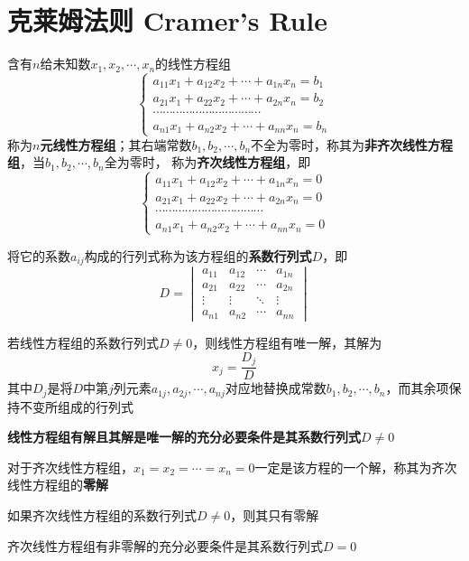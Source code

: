 \documentclass[UTF8]{ctexart}
\newcommand{\emplin}{\vspace{1em}}
\begin{document}
\section*{克莱姆法则 Cramer's Rule}
含有$n$给未知数$x_1,x_2,\cdots,x_n$的线性方程组
\[\left\{
\begin{aligned}
a_{11}x_1+a_{12}x_2+\cdots+a_{1n}x_n=b_1\\
a_{21}x_1+a_{22}x_2+\cdots+a_{2n}x_n=b_2\\
\cdots\cdots\cdots\cdots\cdots\cdots\cdots\cdots\cdots\cdots\cdots\\
a_{n1}x_1+a_{n2}x_2+\cdots+a_{nn}x_n=b_n
\end{aligned}
\right.\]
称为\textbf{$n$元线性方程组}；其右端常数$b_1,b_2,\cdots,b_n$不全为零时，称其为\textbf{非齐次线性方程组}，当$b_1,b_2,\cdots,b_n$全为零时，
称为\textbf{齐次线性方程组}，即
\[\left\{
\begin{aligned}
a_{11}x_1+a_{12}x_2+\cdots+a_{1n}x_n=0\\
a_{21}x_1+a_{22}x_2+\cdots+a_{2n}x_n=0\\
\cdots\cdots\cdots\cdots\cdots\cdots\cdots\cdots\cdots\cdots\cdots\\
a_{n1}x_1+a_{n2}x_2+\cdots+a_{nn}x_n=0
\end{aligned}
\right.\]

将它的系数$a_{ij}$构成的行列式称为该方程组的\textbf{系数行列式$D$}，即
\[
D=\begin{vmatrix}
a_{11}&a_{12}&\cdots&a_{1n}\\
a_{21}&a_{22}&\cdots&a_{2n}\\
\vdots&\vdots&\ddots&\vdots\\
a_{n1}&a_{n2}&\cdots&a_{nn}
\end{vmatrix}
\]

若线性方程组的系数行列式$D\ne0$，则线性方程组有唯一解，其解为
\[x_j=\frac{D_j}{D}\]
其中$D_j$是将$D$中第$j$列元素$a_{1j},a_{2j},\cdots,a_{nj}$对应地替换成常数$b_1,b_2,\cdots,b_n$，而其余项保持不变所组成的行列式

\emplin

\textbf{线性方程组有解且其解是唯一解的充分必要条件是其系数行列式$D\ne0$}

\emplin

对于齐次线性方程组，$x_1=x_2=\cdots=x_n=0$一定是该方程的一个解，称其为齐次线性方程组的\textbf{零解}

\emplin

如果齐次线性方程组的系数行列式$D\ne0$，则其只有零解

齐次线性方程组有非零解的充分必要条件是其系数行列式$D=0$
\end{document}
